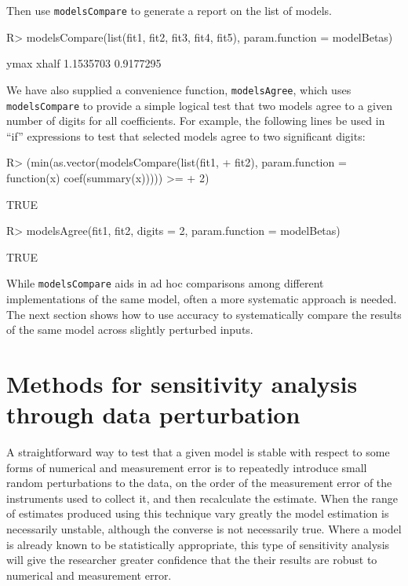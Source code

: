\documentclass[11pt]{article}
\let\code=\texttt
\newcommand{\pkg}[1]{{\normalfont\fontseries{b}\selectfont #1}}
\begin{document}
Then use \code{modelsCompare} to generate a report on the list of models.

\begin{Schunk}
\begin{Sinput}
R> modelsCompare(list(fit1, fit2, fit3, fit4, fit5), param.function = modelBetas)
\end{Sinput}
\begin{Soutput}
     ymax     xhalf 
1.1535703 0.9177295 
\end{Soutput}
\end{Schunk}


We have also supplied a convenience function, \code{modelsAgree}, which uses \code{modelsCompare} to provide a simple logical test that two models agree
to a given number of digits for all coefficients. For example, the following lines
 be used in ``if'' expressions to test that selected models agree to two 
 significant digits:                                 

\begin{Schunk}
\begin{Sinput}
R> (min(as.vector(modelsCompare(list(fit1, 
+     fit2), param.function = function(x) coef(summary(x))))) >= 
+     2)
\end{Sinput}
\begin{Soutput}
[1] TRUE
\end{Soutput}
\begin{Sinput}
R> modelsAgree(fit1, fit2, digits = 2, param.function = modelBetas)
\end{Sinput}
\begin{Soutput}
[1] TRUE
\end{Soutput}
\end{Schunk}

While \code{modelsCompare} aids in ad hoc comparisons among different implementations of the same model, often a more systematic approach is needed. The next section shows how to use \pkg{accuracy} to systematically compare the results of the same model across slightly perturbed inputs. 

\section{Methods for sensitivity analysis through data perturbation}

A straightforward way to test that a given model is stable with respect to
some forms of numerical and measurement error is 
to repeatedly introduce small random perturbations to the data, on the order of the measurement error of the instruments used to collect it, and then recalculate the estimate. When the range of estimates produced using 
this technique vary greatly the model estimation is necessarily unstable, although
the converse is not necessarily true. Where a model is already known to be statistically appropriate,
this type of sensitivity analysis will give the researcher greater confidence that the their 
results are robust to numerical and measurement error.
\end{document}
